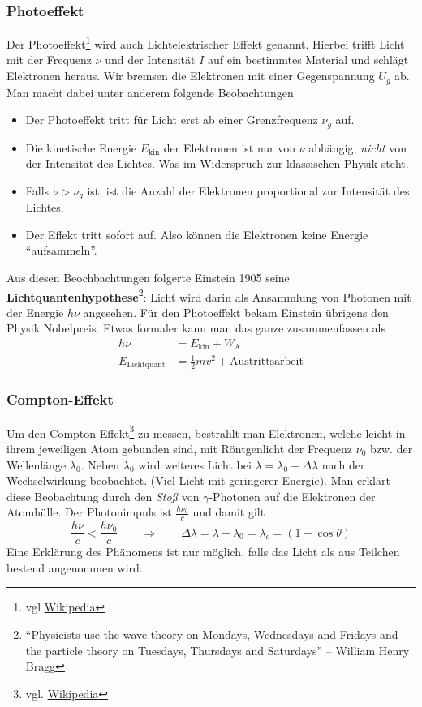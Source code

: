\documentclass[oneside]{book}
\theoremstyle{definition}
\begin{document}
\subsubsection{Photoeffekt} Der Photoeffekt\footnote{vgl \href{https://de.wikipedia.org/wiki/Photoelektrischer_Effekt}{Wikipedia}} wird auch Lichtelektrischer Effekt genannt. Hierbei trifft Licht mit der Frequenz $\nu$ und der Intensität $I$ auf ein bestimmtes Material und schlägt Elektronen heraus. Wir bremsen die Elektronen mit einer Gegenspannung $U_g$ ab. Man macht dabei unter anderem folgende Beobachtungen
\begin{itemize}
	\item Der Photoeffekt tritt für Licht erst ab einer Grenzfrequenz $\nu_g$ auf.
	\item Die kinetische Energie $E_\text{kin}$ der Elektronen ist nur von $\nu$ abhängig, \emph{nicht} von der Intensität des Lichtes. Was im Widerspruch zur klassischen Physik steht.
	\item Falls $\nu > \nu_g$ ist, ist die Anzahl der Elektronen proportional zur Intensität des Lichtes.
	\item Der Effekt tritt sofort auf. Also können die Elektronen keine Energie "`aufsammeln"'.
\end{itemize}
Aus diesen Beochbachtungen folgerte Einstein 1905 seine \textbf{Lichtquantenhypothese}\footnote{"`Physicists use the wave theory on Mondays, Wednesdays and Fridays and the particle theory on Tuesdays, Thursdays and Saturdays"' – William Henry Bragg}: Licht wird darin als Ansammlung von Photonen mit der Energie $h \nu$ angesehen. Für den Photoeffekt bekam Einstein übrigens den Physik Nobelpreis. Etwas formaler kann man das ganze zusammenfassen als
\begin{align*}
h \nu &= E_\text{kin} + W_\text{A}\\
E_\text{Lichtquant} &= \frac12 m v^2 + \text{Austrittsarbeit}
\end{align*}

\subsubsection{Compton-Effekt}
Um den Compton-Effekt\footnote{vgl. \href{https://de.wikipedia.org/wiki/Compton-Effekt}{Wikipedia}} zu messen, bestrahlt man  Elektronen, welche leicht in ihrem jeweiligen Atom gebunden sind, mit Röntgenlicht der Frequenz $\nu_0$ bzw. der Wellenlänge $\lambda_0$. Neben $\lambda_0$ wird weiteres Licht bei $\lambda = \lambda_0 + \Delta \lambda$ nach der Wechselwirkung beobachtet. (Viel Licht mit geringerer Energie). Man erklärt diese Beobachtung durch den \emph{Stoß} von $\gamma$-Photonen auf die Elektronen der Atomhülle.
Der Photonimpuls ist $\frac{h \nu_0}{c}$ und damit gilt 
$$\frac{h \nu}{c} < \frac{h \nu_0}{c} \qquad \Rightarrow \qquad \Delta \lambda = \lambda - \lambda_0 = \lambda_c = (1 - \cos \theta)$$
Eine Erklärung des Phänomens ist nur möglich, falls das Licht als aus Teilchen bestend angenommen wird.
\end{document}
